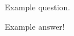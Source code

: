 \documentclass{examdesign}
\begin{document}
\maketitle

\begin{shortanswer}[title={Question block}]
  \begin{question}
    Example question.
    \begin{answer}
      Example answer!
    \end{answer}
  \end{question}
\end{shortanswer}
\end{document}
